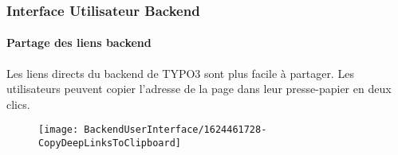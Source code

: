 %

\begin{frame}[fragile]
	\frametitle{Interface Utilisateur Backend}
	\framesubtitle{Partage des liens backend}

	Les liens directs du backend de TYPO3 sont plus facile à partager. Les utilisateurs peuvent
	copier l'adresse de la page dans leur presse-papier en deux clics.

	\begin{figure}
		\texttt{[image: BackendUserInterface/1624461728-CopyDeepLinksToClipboard]}
	\end{figure}

\end{frame}

